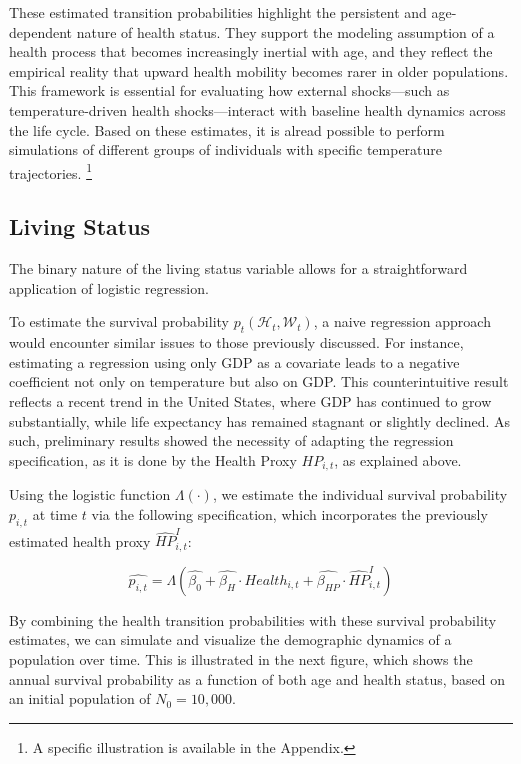 \documentclass{article}
\begin{document}
These estimated transition probabilities highlight the persistent and age-dependent nature of health status. They support the modeling assumption of a health process that becomes increasingly inertial with age, and they reflect the empirical reality that upward health mobility becomes rarer in older populations. This framework is essential for evaluating how external shocks—such as temperature-driven health shocks—interact with baseline health dynamics across the life cycle.
Based on these estimates, 
it is alread possible to perform 
simulations of different groups of individuals with specific temperature trajectories. 
\footnote{A specific illustration is available in the Appendix.}

\subsection{Living Status}
The binary nature of the living status variable allows for a straightforward application of logistic regression.

To estimate the survival probability \( p_t(\mathcal{H}_t, \mathcal{W}_t) \), a naive regression approach would encounter similar issues to those previously discussed.
For instance, estimating a regression using only GDP as a covariate leads to a negative coefficient not only on temperature but also on GDP.
This counterintuitive result reflects a recent trend in the United States, where GDP has continued to grow substantially, while life expectancy has remained stagnant or slightly declined.
As such, preliminary results showed the necessity of adapting the regression specification, as it is done by the Health Proxy $HP_{i,t}$, as explained above.

Using the logistic function \( \Lambda(\cdot) \), we estimate the individual survival probability \( p_{i,t} \) at time \( t \) via the following specification, which incorporates the previously estimated health proxy \( \widehat{HP}_{i,t}^{I} \):

\begin{equation}
    \widehat{p_{i,t}} = \Lambda \left( \widehat{\beta_0} +
    \widehat{\beta_{H}} \cdot Health_{i,t} +
    \widehat{\beta_{HP}} \cdot \widehat{HP}_{i,t}^{I} \right)
\end{equation}

By combining the health transition probabilities with these survival probability estimates, we can simulate and visualize the demographic dynamics of a population over time.
This is illustrated in the next figure, which shows the annual survival probability as a function of both age and health status, based on an initial population of \( N_0 = 10{,}000 \).
\end{document}
